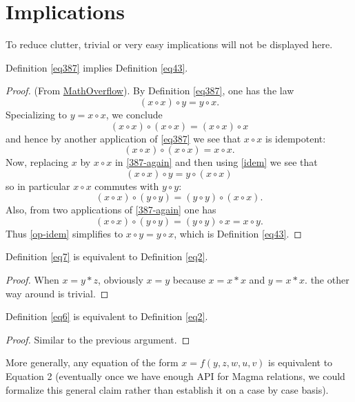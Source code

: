 \chapter{Implications}

To reduce clutter, trivial or very easy implications will not be displayed here.

\begin{theorem}[387 implies 43]\label{387_implies_43}\leanok  Definition \ref{eq387} implies Definition \ref{eq43}.
\end{theorem}

\begin{proof}\leanok (From \href{https://mathoverflow.net/a/450905/766}{MathOverflow}).
  By Definition \ref{eq387}, one has the law
\begin{equation}\label{387-again}
  (x \circ x) \circ y = y \circ x.
\end{equation}
Specializing to $y=x \circ x$, we conclude
$$(x \circ x) \circ (x \circ x) = (x \circ x) \circ x$$
and hence by another application of \eqref{eq387} we see that $x \circ x$ is idempotent:
\begin{equation}\label{idem}
  (x \circ x) \circ (x \circ x) = x \circ x.
\end{equation}
Now, replacing $x$ by $x \circ x$ in \eqref{387-again} and then using \eqref{idem} we see that
$$ (x \circ x) \circ y = y \circ (x \circ x)$$
so in particular $x \circ x$ commutes with $y \circ y$:
\begin{equation}\label{op-idem} (x \circ x) \circ (y \circ y) = (y \circ y) \circ (x \circ x).
\end{equation}
Also, from two applications of \eqref{387-again} one has
$$(x \circ x) \circ (y \circ y) = (y \circ y) \circ x = x \circ y.$$
Thus \eqref{op-idem} simplifies to $x \circ y = y \circ x$, which is Definition \ref{eq43}.
\end{proof}

\begin{theorem}[7 equivalent to 2]\label{7_equiv_2}\leanok  Definition \ref{eq7} is equivalent to Definition \ref{eq2}.
\end{theorem}

\begin{proof}
  When $x = y * z$, obviously $x = y$ because $x = x * x$ and $y = x * x$. the other way around is trivial.
\end{proof}

\begin{theorem}[6 equivalent to 2]\label{6_equiv_2}\leanok  Definition \ref{eq6} is equivalent to Definition \ref{eq2}.
\end{theorem}

\begin{proof}  Similar to the previous argument.
\end{proof}

More generally, any equation of the form $x = f(y,z,w,u,v)$ is equivalent to Equation 2 (eventually once we have enough API for Magma relations, we could formalize this general claim rather than establish it on a case by case basis).
